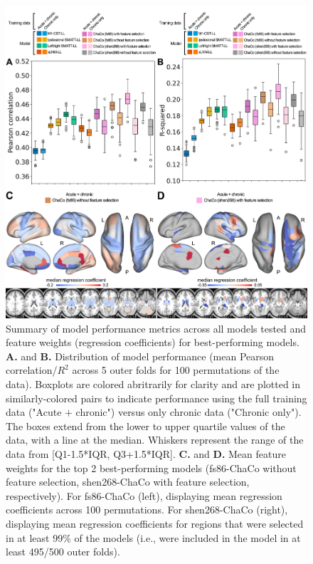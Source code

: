 \documentclass[10pt]{article}
\def\Plus{\texttt{+}}
\begin{document}
\begin{figure}[htp]
\centering
\includegraphics[width=1\linewidth]{figures/Analysis1.png}
\caption{Summary of model performance metrics across all models tested and feature weights (regression coefficients) for best-performing models.  \textbf{A.} and \textbf{B.} Distribution of model performance (mean Pearson correlation/$R^2$ across 5 outer folds for 100 permutations of the data).  Boxplots are colored abritrarily for clarity and are plotted in similarly-colored pairs to indicate performance using the full training data ("Acute $\Plus$  chronic") versus only chronic data ("Chronic only"). The boxes extend from the lower to upper quartile values of the data, with a line at the median. Whiskers represent the range of the data from [Q1-1.5*IQR, Q3+1.5*IQR].
\textbf{C.} and \textbf{D.} Mean feature weights for the top 2 best-performing models (fs86-ChaCo without feature selection, shen268-ChaCo with feature selection, respectively). For fs86-ChaCo (left), displaying mean regression coefficients across 100 permutations. For shen268-ChaCo (right), displaying mean regression coefficients for regions that were selected in at least 99$\%$ of the models (i.e., were included in the model in at least 495/500 outer folds). }
\label{analysis1}
\end{figure}
\end{document}
